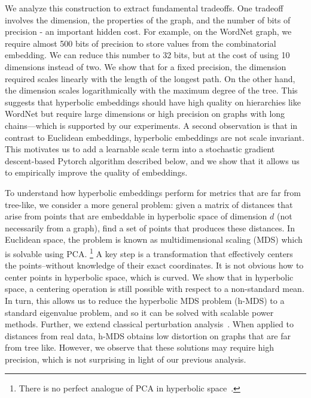 We analyze this construction to extract fundamental tradeoffs. One tradeoff involves  the
dimension, the properties of the graph, and the number of bits of precision - an important hidden cost. For example, on the WordNet graph, we require almost 500 bits of precision to store values from the combinatorial embedding. We can reduce this number to 32 bits, but at the cost of using 10 dimensions instead of two. We show that for a fixed precision, the dimension
required scales linearly with the length of the longest path. On the
other hand, the dimension scales logarithmically with the maximum
degree of the tree. This suggests that hyperbolic embeddings should
have high quality on hierarchies like WordNet but require large
dimensions or high precision on graphs with long chains---which is supported by our
experiments. A second observation is that in contrast to Euclidean
embeddings, hyperbolic embeddings are not scale invariant. This
motivates us to add a learnable scale term into a stochastic gradient descent-based Pytorch algorithm
described below, and we show that it allows us to empirically improve the
quality of embeddings.

To understand how hyperbolic embeddings perform for metrics that are
far from tree-like, we consider a more general problem: given a matrix
of distances that arise from points that are embeddable in hyperbolic
space of dimension $d$ (not necessarily from a graph), find a set of
points that produces these distances. In Euclidean space, the problem
is known as multidimensional scaling (MDS) which is solvable using
PCA.%
\footnote{There is no perfect analogue of PCA in hyperbolic
space~\cite{annals:stats}.}
A key step is a transformation that
effectively centers the points--without knowledge of their exact
coordinates. It is not obvious how to center points in hyperbolic
space, which is curved.
We show that in hyperbolic space, a centering operation is still possible with respect to a non-standard mean.
In turn, this allows us to reduce the hyperbolic
MDS problem (h-MDS) to a standard eigenvalue problem, and so
it can be solved with scalable power methods.
Further, we extend
classical perturbation analysis~\cite{Sibson1,Sibson2}. When applied to distances from real data,
h-MDS obtains low distortion on graphs that are far from tree
like. However, we observe that these solutions may require high
precision, which is not surprising in light of our previous analysis.

